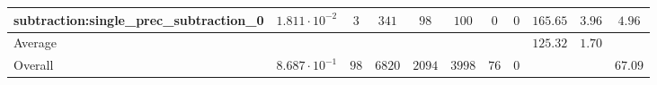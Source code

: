\begin{tabular}{|l|c|c|c|c|c|c|c|c|c|c|}
subtraction:single\_prec\_subtraction\_0         & $ 1.811 \cdot 10^{-2} $ & $ 3      $ & $ 341  $ & $ 98   $ & $ 100   $ & $ 0  $ & $ 0 $ & $ 165.65      $ & $ 3.96    $ & $ 4.96    $ \\
\hline
Average                                          & $                     $ & $        $ & $      $ & $      $ & $       $ & $    $ & $   $ & $ 125.32      $ & $ 1.70    $ & $         $ \\
\hline
Overall                                          & $ 8.687 \cdot 10^{-1} $ & $ 98     $ & $ 6820 $ & $ 2094 $ & $ 3998  $ & $ 76 $ & $ 0 $ & $             $ & $         $ & $ 67.09   $ \\
\hline
\end{tabular}

